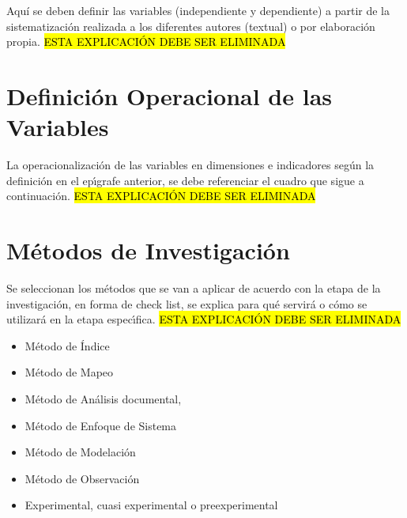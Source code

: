 Aqu\'i se deben definir las variables (independiente y dependiente) a partir de la sistematizaci\'on 
realizada a los diferentes autores (textual) o por elaboraci\'{o}n propia. \hl{ESTA EXPLICACI\'{O}N 
DEBE SER ELIMINADA}


\section{Definici\'{o}n Operacional de las Variables}
\label{cap2:sec:definicion_operacional_de_las_variables}

La operacionalizaci\'{o}n de las variables en dimensiones e indicadores seg\'{u}n la definici\'{o}n 
en el ep\'{\i}grafe anterior, se debe referenciar el cuadro que sigue a continuaci\'{o}n. \hl{ESTA 
EXPLICACI\'{O}N DEBE SER ELIMINADA}


\section{M\'{e}todos de Investigaci\'{o}n}
\label{cap2:sec:metodos_de_investigacion}

Se seleccionan los m\'{e}todos que se van a aplicar de acuerdo con la etapa de la investigaci\'{o}n, 
en forma de check list, se explica para qu\'{e} servir\'{a} o c\'{o}mo se utilizar\'{a} en la etapa 
espec\'{\i}fica. \hl{ESTA EXPLICACI\'{O}N DEBE SER ELIMINADA} 

\begin{itemize}
\item M\'{e}todo de \'{I}ndice  

\item M\'{e}todo de Mapeo 

\item M\'{e}todo de An\'{a}lisis documental,  

\item M\'{e}todo de Enfoque de Sistema 

\item M\'{e}todo de Modelaci\'{o}n 

\item M\'{e}todo de Observaci\'{o}n 

\item Experimental, cuasi experimental o preexperimental 
\end{itemize}

